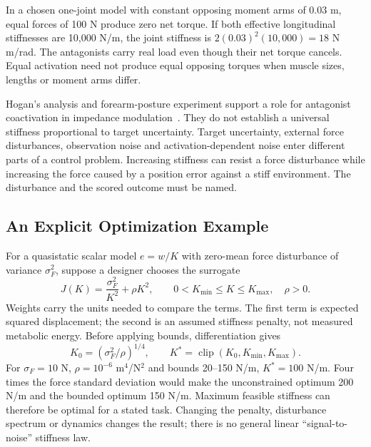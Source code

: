 In a chosen one-joint model with constant opposing moment arms of 0.03 m,
equal forces of 100 N produce zero net torque. If both effective longitudinal
stiffnesses are 10,000 N/m, the joint stiffness is
$2(0.03)^2(10{,}000)=18$ N\,m/rad. The antagonists carry real load even though
their net torque cancels. Equal activation need not produce equal opposing
torques when muscle sizes, lengths or moment arms differ.

Hogan's analysis and forearm-posture experiment support a role for antagonist
coactivation in impedance modulation~\cite{Hogan1984}. They do not establish
a universal stiffness proportional to target uncertainty. Target uncertainty,
external force disturbances, observation noise and activation-dependent noise
enter different parts of a control problem. Increasing stiffness can resist
a force disturbance while increasing the force caused by a position error
against a stiff environment. The disturbance and the scored outcome must be named.

\subsection{An Explicit Optimization Example}

For a quasistatic scalar model $e=w/K$ with zero-mean force disturbance of
variance $\sigma_F^2$, suppose a designer chooses the surrogate
\begin{equation}
J(K)=\frac{\sigma_F^2}{K^2}+\rho K^2,\qquad
0<K_{\min}\leq K\leq K_{\max},\quad\rho>0.
\label{eq:ch8:impedance-cost}
\end{equation}
Weights carry the units needed to compare the terms. The first term is expected
squared displacement; the second is an assumed stiffness penalty, not measured
metabolic energy. Before applying bounds, differentiation gives
\begin{equation}
K_0=(\sigma_F^2/\rho)^{1/4},\qquad
K^*=\operatorname{clip}(K_0,K_{\min},K_{\max}).
\label{eq:ch8:optimal-k}
\end{equation}
For $\sigma_F=10$ N, $\rho=10^{-6}$ m$^4$/N$^2$ and bounds
20--150 N/m, $K^*=100$ N/m. Four times the force standard deviation would
make the unconstrained optimum 200 N/m and the bounded optimum 150 N/m.
Maximum feasible stiffness can therefore be optimal for a stated task. Changing
the penalty, disturbance spectrum or dynamics changes the result; there is
no general linear ``signal-to-noise'' stiffness law.

